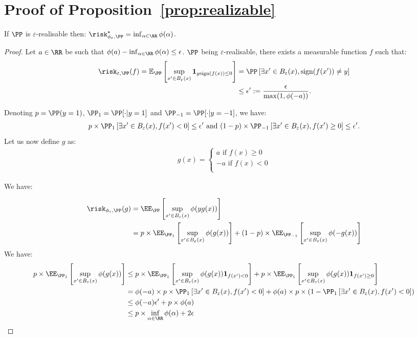 \section{Proof of Proposition~\ref{prop:realizable}}
\begin{lemma}
\label{lemma:realisable}
If $\PP$ is $\varepsilon$-realisable then: $\risk^\star_{\phi_\varepsilon,\PP}=\inf_{\alpha\in\RR}\phi(\alpha)$.
\end{lemma}
\begin{proof}
Let $a\in\RR$ be such that $\phi(a)-\inf_{\alpha\in\RR} \phi(\alpha) \leq \epsilon$. $\PP$ being $\varepsilon$-realisable, there exists a measurable function $f$ such that:
\begin{align*}
   \risk_{\varepsilon,\PP}(f) = \mathbb{E}_\PP\left[\sup_{x'\in B_\varepsilon(x)} \mathbf{1}_{y\text{sign}(f(x))\leq 0}\right] &=  \PP\left[\exists x'\in B_\varepsilon(x), \text{sign}(f(x'))\neq y\right]\\
   &\leq \epsilon':= \frac{\epsilon}{\max(1,\phi(-a))}.\\
\end{align*}

Denoting $p =\PP(y=1)$, $\PP_1 = \PP[\cdot|y=1]$ and $\PP_{-1} = \PP[\cdot|y=-1]$, we have:
\begin{align*}
        p\times\PP_1\left[\exists x'\in B_\varepsilon(x), f(x')<0\right]\leq \epsilon'\text{ and }
                (1-p)\times\PP_{-1}\left[\exists x'\in B_\varepsilon(x), f(x')\geq0\right]\leq \epsilon'.
\end{align*}
Let us now define $g$ as:
\begin{align*}
     g(x)= \left\{
    \begin{array}{ll}
    a\text{ if } f(x)\geq 0\\
    -a\text{ if } f(x)< 0\\
  \end{array}
  \right.
\end{align*}

We have:

\begin{align*}
\risk_{\phi_\varepsilon,\PP}(g) &= \EE_\PP\left[\sup_{x'\in B_\varepsilon(x)}\phi(yg(x))\right]\\
&=p\times\EE_{\PP_1}\left[\sup_{x'\in B_\varepsilon(x)}\phi(g(x))\right] +(1-p)\times\EE_{\PP_{-1}}\left[\sup_{x'\in B_\varepsilon(x)}\phi(-g(x))\right]
\end{align*}
We have:
\begin{align*}
  p\times\EE_{\PP_1}\left[\sup_{x'\in B_\varepsilon(x)}\phi(g(x))\right]&\leq p\times\EE_{\PP_1}\left[\sup_{x'\in B_\varepsilon(x)}\phi(g(x))\mathbf{1}_{f(x')<0}\right]+p\times\EE_{\PP_1}\left[\sup_{x'\in B_\varepsilon(x)}\phi(g(x))\mathbf{1}_{f(x')\geq 0}\right] \\
  &=\phi(-a)\times p\times \PP_1\left[\exists x'\in B_\varepsilon(x), f(x')<0\right] + \phi(a)\times p\times\left(1- \PP_1\left[\exists x'\in B_\varepsilon(x), f(x')<0\right]\right)\\
  &\leq\phi(-a) \epsilon'+p\times\phi(a)\\
  &\leq p\times\inf_{\alpha\in\RR}\phi(\alpha) + 2\epsilon
\end{align*}


\end{proof}
